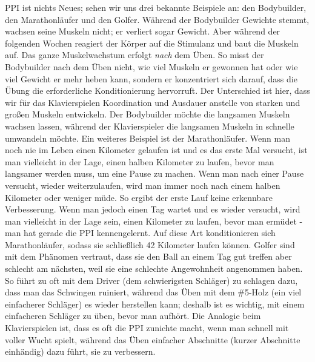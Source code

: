 PPI ist nichts Neues; sehen wir uns drei bekannte Beispiele an: den Bodybuilder, den Marathonläufer und den Golfer.
Während der Bodybuilder Gewichte stemmt, wachsen seine Muskeln nicht; er verliert sogar Gewicht.
Aber während der folgenden Wochen reagiert der Körper auf die Stimulanz und baut die Muskeln auf.
Das ganze Muskelwachstum erfolgt \textit{nach} dem Üben.
So misst der Bodybuilder nach dem Üben nicht, wie viel Muskeln er gewonnen hat oder wie viel Gewicht er mehr heben kann, sondern er konzentriert sich darauf, dass die Übung die erforderliche Konditionierung hervorruft.
Der Unterschied ist hier, dass wir für das Klavierspielen Koordination und Ausdauer anstelle von starken und großen Muskeln entwickeln.
Der Bodybuilder möchte die langsamen Muskeln wachsen lassen, während der Klavierspieler die langsamen Muskeln in schnelle umwandeln möchte.
Ein weiteres Beispiel ist der Marathonläufer.
Wenn man noch nie im Leben einen Kilometer gelaufen ist und es das erste Mal versucht, ist man vielleicht in der Lage, einen halben Kilometer zu laufen, bevor man langsamer werden muss, um eine Pause zu machen.
Wenn man nach einer Pause versucht, wieder weiterzulaufen, wird man immer noch nach einem halben Kilometer oder weniger müde.
So ergibt der erste Lauf keine erkennbare Verbesserung.
Wenn man jedoch einen Tag wartet und es wieder versucht, wird man vielleicht in der Lage sein, einen Kilometer zu laufen, bevor man ermüdet - man hat gerade die PPI kennengelernt.
Auf diese Art konditionieren sich Marathonläufer, sodass sie schließlich 42 Kilometer laufen können.
Golfer sind mit dem Phänomen vertraut, dass sie den Ball an einem Tag gut treffen aber schlecht am nächsten, weil sie eine schlechte Angewohnheit angenommen haben.
So führt zu oft mit dem Driver (dem schwierigsten Schläger) zu schlagen dazu, dass man das Schwingen ruiniert, während das Üben mit dem \#5-Holz (ein viel einfacherer Schläger) es wieder herstellen kann; deshalb ist es wichtig, mit einem einfacheren Schläger zu üben, bevor man aufhört.
Die Analogie beim Klavierspielen ist, dass es oft die PPI zunichte macht, wenn man schnell mit voller Wucht spielt, während das Üben einfacher Abschnitte (kurzer Abschnitte einhändig) dazu führt, sie zu verbessern.

